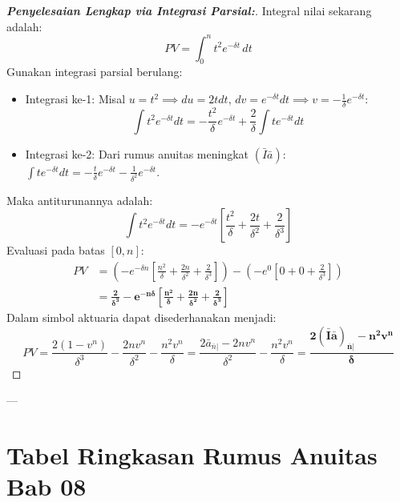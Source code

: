\documentclass[11pt,a4paper]{article}
\begin{document}
\begin{proof}[\textbf{Penyelesaian Lengkap via Integrasi Parsial:}]
Integral nilai sekarang adalah:
\begin{equation*}
    PV = \int_0^n t^2 e^{-\delta t} \, dt
\end{equation*}
Gunakan integrasi parsial berulang:
\begin{itemize}
    \item Integrasi ke-1: Misal $u = t^2 \implies du = 2t dt$, $dv = e^{-\delta t} dt \implies v = -\frac{1}{\delta} e^{-\delta t}$:
    \begin{equation*}
        \int t^2 e^{-\delta t} dt = -\frac{t^2}{\delta} e^{-\delta t} + \frac{2}{\delta} \int t e^{-\delta t} dt
    \end{equation*}
    \item Integrasi ke-2: Dari rumus anuitas meningkat $(\bar{I}\bar{a})$: $\int t e^{-\delta t} dt = -\frac{t}{\delta} e^{-\delta t} - \frac{1}{\delta^2} e^{-\delta t}$.
\end{itemize}
Maka antiturunannya adalah:
\begin{equation*}
    \int t^2 e^{-\delta t} dt = -e^{-\delta t} \left[ \frac{t^2}{\delta} + \frac{2t}{\delta^2} + \frac{2}{\delta^3} \right]
\end{equation*}
Evaluasi pada batas $[0, n]$:
\begin{align*}
    PV &= \left( -e^{-\delta n} \left[ \frac{n^2}{\delta} + \frac{2n}{\delta^2} + \frac{2}{\delta^3} \right] \right) - \left( -e^0 \left[ 0 + 0 + \frac{2}{\delta^3} \right] \right) \\
       &= \mathbf{\frac{2}{\delta^3} - e^{-n\delta} \left[ \frac{n^2}{\delta} + \frac{2n}{\delta^2} + \frac{2}{\delta^3} \right]}
\end{align*}
Dalam simbol aktuaria dapat disederhanakan menjadi:
\begin{equation*}
    PV = \frac{2(1 - v^n)}{\delta^3} - \frac{2n v^n}{\delta^2} - \frac{n^2 v^n}{\delta} = \frac{2\bar{a}_{\overline{n}|} - 2n v^n}{\delta^2} - \frac{n^2 v^n}{\delta} = \mathbf{\frac{2(\bar{I}\bar{a})_{\overline{n}|} - n^2 v^n}{\delta}}
\end{equation*}
\end{proof}

---

\section{Tabel Ringkasan Rumus Anuitas Bab 08}
\end{document}

